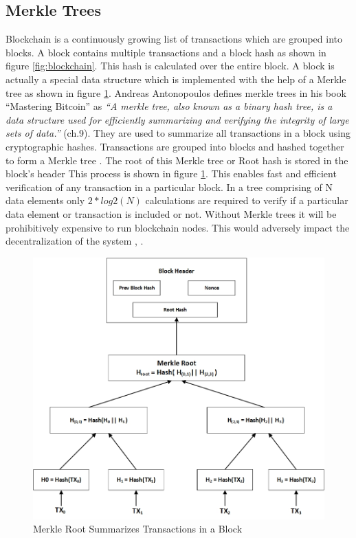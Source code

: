 \subsection{Merkle Trees} \label{MerkleTrees}
Blockchain is a continuously growing list of transactions which are grouped into blocks. A block contains multiple transactions and a block hash as shown in figure \ref{fig:blockchain}. This hash is calculated over the entire block. A block is actually a special data structure which is implemented with the help of a Merkle tree as shown in figure \ref{fig:mtree}. Andreas Antonopoulos defines merkle trees in his book “Mastering Bitcoin” as \textit{“A merkle tree, also known as a binary hash tree, is a data structure used for efficiently summarizing and verifying the integrity of large sets of data.”} \cite{andy_mb} (ch.9). They are used to summarize all transactions in a block using cryptographic hashes. Transactions are grouped into blocks and hashed together to form a Merkle tree \cite{paper:001}. The root of this Merkle tree or Root hash is stored in the block's header This process is shown in figure \ref{fig:mtree}. This enables fast and efficient verification of any transaction in a particular block. In a tree comprising of N data elements only \(2*log2 (N)\) calculations are required to verify if a particular data element or transaction is included or not. Without Merkle trees it will be prohibitively expensive to run blockchain nodes. This would adversely impact the decentralization of the system \cite{cryptoeprint:2018:274}, \cite{paper:001}. 
\vspace*{1mm}
\begin{figure}[h]
	\centering
    \includegraphics[width=130mm,scale=1]{figs/mtree}
	\caption{Merkle Root Summarizes Transactions in a Block} 
	\label{fig:mtree}
\end{figure}

